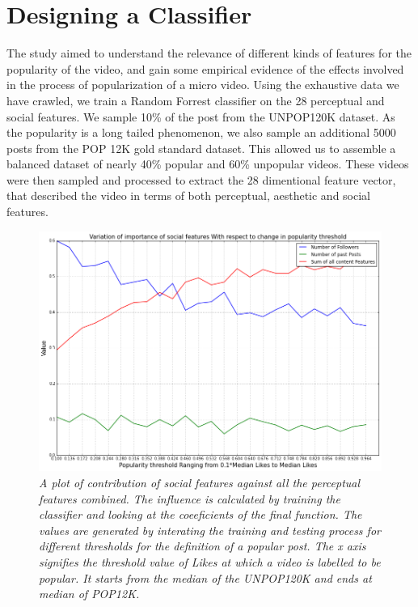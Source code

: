 \section{Designing a Classifier}
The study aimed to understand the relevance of different kinds of features for the popularity of the video, and gain some empirical evidence of the effects involved in the process of popularization of a micro video. Using the exhaustive data we have crawled, we train a Random Forrest classifier on the 28 perceptual and social features. 
We sample 10\% of the post from the UNPOP120K dataset. As the popularity is a long tailed phenomenon, we also sample an additional 5000 posts from the POP 12K gold standard dataset. This allowed us to assemble a balanced dataset of nearly 40\% popular and 60\% unpopular videos. These videos were then sampled and processed to extract the 28 dimentional feature vector, that described the video in terms of both perceptual, aesthetic and social features. 


\begin{figure}[!htb]
\centering
\includegraphics[width=\columnwidth]{plots/Feature_importance_Likes}
\caption{\textsl{ A plot of contribution of social features against all the perceptual features combined. The influence is calculated by training the classifier and looking at the coeeficients of the final function. The values are generated by interating the training and testing process for different thresholds for the definition of a popular post. The x axis signifies the threshold value of Likes at which a video is labelled to be popular. It starts from the median of the UNPOP120K and ends at median of POP12K. }}
\label{fig:Feature_importance}
\end{figure}


